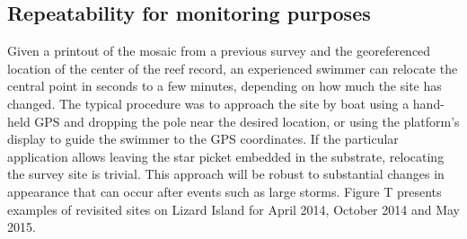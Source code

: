 
\subsection{Repeatability for monitoring purposes}
Given a printout of the mosaic from a previous survey and the georeferenced location of the center of the reef record, an experienced swimmer can relocate the central point in seconds to a few minutes, depending on how much the site has changed. The typical procedure was to approach the site by boat using a hand-held GPS and dropping the pole near the desired location, or using the platform's display to guide the swimmer to the GPS coordinates.
If the particular application allows leaving the star picket embedded in the substrate, relocating the survey site is trivial. This approach will be robust to substantial changes in appearance that can occur after events such as large storms.
Figure T presents examples of revisited sites on Lizard Island for April 2014, October 2014 and May 2015.
